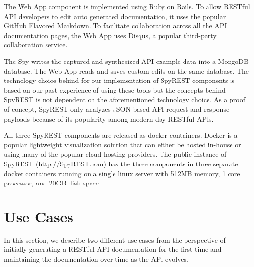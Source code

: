 \documentclass[conference]{IEEEtran}
\begin{document}
The Web App component is implemented using Ruby on Rails. To allow RESTful API developers to edit auto generated documentation, it uses the popular GitHub Flavored Markdown. To facilitate collaboration across all the API documentation pages, the Web App uses Disqus, a popular third-party collaboration service.

The Spy writes the captured and synthesized API example data into a MongoDB database. The Web App reads and saves custom edits on the same database. The technology choice behind for our implementation of SpyREST components is based on our past experience of using these tools but the concepts behind SpyREST is not dependent on the aforementioned technology choice. As a proof of concept, SpyREST only analyzes JSON based API request and response payloads because of its popularity among modern day RESTful APIs.

All three SpyREST components are released as docker containers. Docker is a popular lightweight visualization solution that can either be hosted in-house or using many of the popular cloud hosting providers. The public instance of SpyREST (http://SpyREST.com) has the three components in three separate docker containers running on a single linux server with 512MB memory, 1 core processor, and 20GB disk space.

\section{Use Cases}
In this section, we describe two different use cases from the perspective of initially generating a RESTful API documentation for the first time and maintaining the documentation over time as the API evolves.
\end{document}
